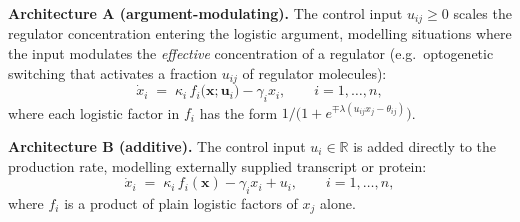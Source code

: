 \documentclass[12pt]{article}
\begin{document}
\smallskip
\noindent\textbf{Architecture A (argument-modulating).}\;
The control input $u_{ij}\geq 0$ scales the regulator concentration entering
the logistic argument, modelling situations where the input modulates the
\emph{effective} concentration of a regulator (e.g.\ optogenetic switching
that activates a fraction $u_{ij}$ of regulator molecules):
\begin{equation}
\dot{x}_i \;=\; \kappa_i\, f_i\bigl(\mathbf{x};\mathbf{u}_i\bigr) - \gamma_i x_i,
\qquad i=1,\ldots,n,
\label{eq:control_expression}
\end{equation}
where each logistic factor in $f_i$ has the form
$1/\bigl(1+e^{\mp\lambda(u_{ij}x_j-\theta_{ij})}\bigr)$.

\smallskip
\noindent\textbf{Architecture B (additive).}\;
The control input $u_i\in\mathbb{R}$ is added directly to the production rate,
modelling externally supplied transcript or protein:
\begin{equation}
\dot{x}_i \;=\; \kappa_i\, f_i(\mathbf{x}) - \gamma_i x_i + u_i,
\qquad i=1,\ldots,n,
\label{eq:additive_control}
\end{equation}
where $f_i$ is a product of plain logistic factors of $x_j$ alone.
\end{document}
